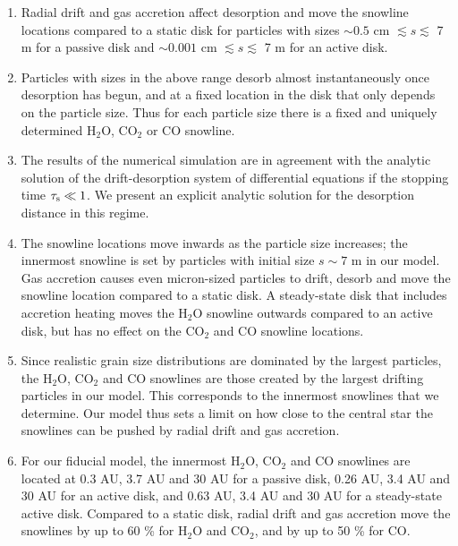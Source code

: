 \documentclass[apj]{emulateapj}
\begin{document}
\begin{enumerate}
\item Radial drift and gas accretion affect desorption and move the snowline locations compared to a static disk for particles with sizes $\sim$$0.5$ cm $\lesssim s \lesssim$ 7 m for a passive disk and $\sim$$0.001$ cm $\lesssim s \lesssim$ 7 m for an active disk. %

\item Particles with sizes in the above range desorb almost instantaneously once desorption has begun, and at a fixed location in the disk that only depends on the particle size. Thus for each particle size there is a fixed and uniquely determined H$_2$O, CO$_2$ or CO snowline. 

\item The results of the numerical simulation are in agreement with the analytic solution of the drift-desorption system of differential equations if the stopping time $\tau_{\rm s} \ll 1$. We present an explicit analytic solution for the desorption distance in this regime.  

\item The snowline locations move inwards as the particle size increases; the innermost snowline is set by particles with initial size $s \sim 7$ m in our model. Gas accretion causes even micron-sized particles to drift, desorb and move the snowline location compared to a static disk. A steady-state disk that includes accretion heating moves the H$_2$O snowline outwards compared to an active disk, but has no effect on the CO$_2$ and CO snowline locations.

\item Since realistic grain size distributions are dominated by the largest particles, the H$_2$O, CO$_2$ and CO snowlines are those created by the largest drifting particles in our model. This corresponds to the innermost snowlines that we determine. Our model thus sets a limit on how close to the central star the snowlines can be pushed by radial drift and gas accretion.

\item For our fiducial model, the innermost H$_2$O, CO$_2$ and CO snowlines are located at 0.3 AU, 3.7 AU and 30 AU for a passive disk, 0.26 AU, 3.4 AU and 30 AU for an active disk, and 0.63 AU, 3.4 AU and 30 AU for a steady-state active disk. Compared to a static disk, radial drift and gas accretion move the snowlines by up to 60 \% for H$_2$O and CO$_2$, and by up to 50 \% for CO. 


\end{enumerate}
\end{document}
